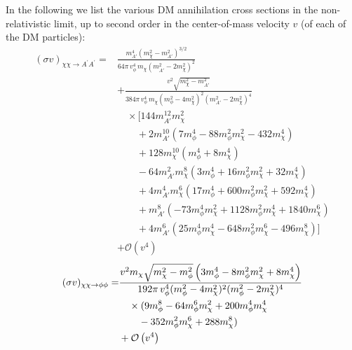 In the following we list the various \ac{DM} annihilation cross sections in the non-relativistic limit, up to second order in the center-of-mass velocity $v$ (of each of the \ac{DM} particles):
\begin{align}\label{eq:sig-cc-aa}
	(\sigma v)_{\chi\chi \to A^{\prime}A^{\prime}}
	= &   \frac{m_{A'}^4 (m_\chi^2 - m_{A'}^2)^{3/2}}{64 \pi \, v_\phi^4 \, m_\chi(m_{A'}^2 - 2 m_\chi^2)^2} \nonumber \\ & +
	\frac{v^2 \sqrt{m_\chi^2 - m_{A'}^2}}{384 \pi \, v_\phi^4 \, m_\chi (m_\phi^2 - 4 m_\chi^2)^2 (m_{A'}^2 - 2 m_\chi^2)^4} \nonumber \\ & \quad \times
	\Big[144 m_{A'}^{12} m_\chi^2   \nonumber \\ & \qquad 
	+ 2 m_{A'}^{10} (7 m_\phi^4 - 88 m_\phi^2 m_\chi^2 - 432 m_\chi^4)  \nonumber \\ & \qquad 
	+ 128 m_\chi^{10} (m_\phi^4 + 8 m_\chi^4) \nonumber \\ & \qquad  -	64 m_{A'}^2 m_\chi^8 (3 m_\phi^4 + 16 m_\phi^2 m_\chi^2 +
	32 m_\chi^4) \nonumber \\ & \qquad 
	+ 4 m_{A'}^4 m_\chi^6 (17 m_\phi^4 + 600 m_\phi^2 m_\chi^2 + 592 m_\chi^4) \nonumber \\ & \qquad +
	m_{A'}^8 (-73 m_\phi^4 m_\chi^2 + 1128 m_\phi^2 m_\chi^4 + 1840 m_\chi^6) \nonumber \\ & \qquad + 4 m_{A'}^6 (25 m_\phi^4 m_\chi^4 -
	648 m_\phi^2 m_\chi^6 - 496 m_\chi^8)\Big]\nonumber \\
	&+ \mathcal{O}\left(v^4\right)
\end{align}
\begin{align}
	(\sigma v)_{\chi\chi \to \phi\phi}
	= & \frac{v^2 m_\chi \sqrt{m_\chi^2 - m_\phi^2} \left(3 m_\phi^4 - 8 m_\phi^2 m_\chi^2 + 8 m_\chi^4\right)}{192 \pi \, v_\phi^4 (m_\phi^2 - 4 m_\chi^2)^2 (m_\phi^2 - 2 m_\chi^2)^4}  \nonumber \\ & \quad \times  \small(9m_\phi^8 - 64 m_\phi^6 m_\chi^2 + 200 m_\phi^4 m_\chi^4  \nonumber \\ & \qquad - 352 m_\phi^2 m_\chi^6 + 288 m_\chi^8\small) \nonumber\\
	& + \mathcal{O}\left(v^4\right)
\end{align}

